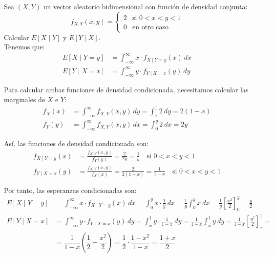 \begin{ejemplo}
    Sea $(X,Y)$ un vector aleatorio bidimensional con función de densidad conjunta:
    \begin{equation*}
        f_{X,Y}(x,y) = \begin{cases}
            2 & \text{si } 0< x< y< 1 \\
            0 & \text{en otro caso}
        \end{cases}
    \end{equation*}
    Calcular $E[X\mid Y]$ y $E[Y\mid X]$.\\

    Tenemos que:
    \begin{align*}
        E[X\mid Y = y] &= \int_{-\infty}^{\infty} x\cdot f_{X\mid Y=y}(x)~dx\\
        E[Y\mid X = x] &= \int_{-\infty}^{\infty} y\cdot f_{Y\mid X=x}(y)~dy
    \end{align*}

    Para calcular ambas funciones de densidad condicionada, necesitamos calcular las marginales de $X$ e $Y$:
    \begin{align*}
        f_X(x) &= \int_{-\infty}^{\infty} f_{X,Y}(x,y)~dy = \int_{x}^{1} 2~dy = 2(1-x)\\
        f_Y(y) &= \int_{-\infty}^{\infty} f_{X,Y}(x,y)~dx = \int_{0}^{y} 2~dx = 2y
    \end{align*}

    Así, las funciones de densidad condicionada son:
    \begin{align*}
        f_{X\mid Y=y}(x) &= \frac{f_{X,Y}(x,y)}{f_Y(y)} = \frac{2}{2y} = \frac{1}{y} \quad \text{si } 0< x< y< 1\\
        f_{Y\mid X=x}(y) &= \frac{f_{X,Y}(x,y)}{f_X(x)} = \frac{2}{2(1-x)} = \frac{1}{1-x} \quad \text{si } 0< x< y< 1
    \end{align*}

    Por tanto, las esperanzas condicionadas son:
    \begin{align*}
        E[X\mid Y = y] &= \int_{-\infty}^{\infty} x\cdot f_{X\mid Y=y}(x)~dx = \int_{0}^{y} x\cdot \frac{1}{y}~dx = \frac{1}{y}\int_{0}^{y} x~dx = \frac{1}{y}\left[\frac{x^2}{2}\right]_{0}^{y} = \frac{y}{2}\\
        E[Y\mid X = x] &= \int_{-\infty}^{\infty} y\cdot f_{Y\mid X=x}(y)~dy = \int_{x}^{1} y\cdot \frac{1}{1-x}~dy = \frac{1}{1-x}\int_{x}^{1} y~dy = \frac{1}{1-x}\left[\frac{y^2}{2}\right]_{x}^{1} =\\&= \dfrac{1}{1-x}\left(\dfrac{1}{2}-\dfrac{x^2}{2}\right) = \dfrac{1}{2}\cdot \dfrac{1-x^2}{1-x} = \dfrac{1+x}{2}
    \end{align*}
\end{ejemplo}

